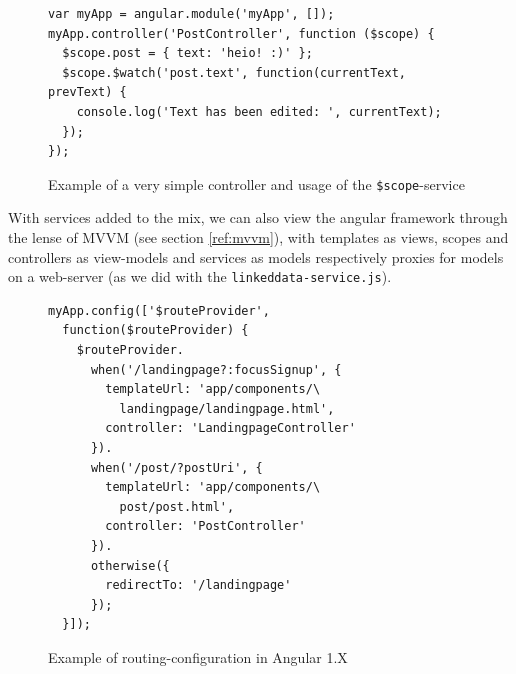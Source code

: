 \begin{figure}
\centering
\begin{verbatim}
var myApp = angular.module('myApp', []);
myApp.controller('PostController', function ($scope) {
  $scope.post = { text: 'heio! :)' };
  $scope.$watch('post.text', function(currentText, prevText) {
    console.log('Text has been edited: ', currentText);
  });
});
\end{verbatim}
\caption{Example of a very simple controller and usage of the \texttt{\$scope}-service}
\label{fig:ng-simple-ctrl}
\end{figure}

With services added to the mix, we can also view the angular framework through the lense of MVVM (see section \ref{ref:mvvm}), with templates as views, scopes and controllers as view-models and services as models respectively proxies for models on a web-server (as we did with the \texttt{linkeddata-service.js}).





\begin{figure}
\centering
\begin{verbatim}
myApp.config(['$routeProvider',
  function($routeProvider) {
    $routeProvider.
      when('/landingpage?:focusSignup', {
        templateUrl: 'app/components/\
          landingpage/landingpage.html',
        controller: 'LandingpageController'
      }).
      when('/post/?postUri', {
        templateUrl: 'app/components/\
          post/post.html',
        controller: 'PostController'
      }).
      otherwise({
        redirectTo: '/landingpage'
      });
  }]);
\end{verbatim}
\caption{Example of routing-configuration in Angular 1.X}
\label{fig:ng-simple-routing}
\end{figure}



